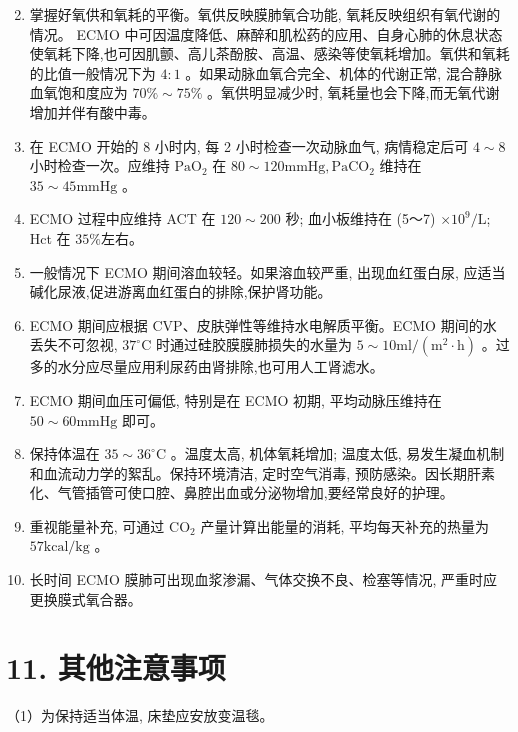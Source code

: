 \documentclass[10pt]{article}
\begin{document}
\begin{enumerate}
  \setcounter{enumi}{1}
  \item 掌握好氧供和氧耗的平衡。氧供反映膜肺氧合功能, 氧耗反映组织有氧代谢的情况。 ECMO 中可因温度降低、麻醉和肌松药的应用、自身心肺的休息状态使氧耗下降,也可因肌颤、高儿茶酚胺、高温、感染等使氧耗增加。氧供和氧耗的比值一般情况下为 $4: 1$ 。如果动脉血氧合完全、机体的代谢正常, 混合静脉血氧饱和度应为 $70 \% \sim 75 \%$ 。氧供明显减少时, 氧耗量也会下降,而无氧代谢增加并伴有酸中毒。

  \item 在 ECMO 开始的 8 小时内, 每 2 小时检查一次动脉血气, 病情稳定后可 $4 \sim 8$ 小时检查一次。应维持 $\mathrm{PaO}_{2}$ 在 $80 \sim 120 \mathrm{mmHg}, \mathrm{PaCO}_{2}$ 维持在 $35 \sim 45 \mathrm{mmHg}$ 。

  \item ECMO 过程中应维持 ACT 在 $120 \sim 200$ 秒; 血小板维持在 (5～7) $\times 10^{9} / \mathrm{L}$; Hct 在 $35 \%$左右。

  \item 一般情况下 ECMO 期间溶血较轻。如果溶血较严重, 出现血红蛋白尿, 应适当碱化尿液,促进游离血红蛋白的排除,保护肾功能。

  \item ECMO 期间应根据 CVP、皮肤弹性等维持水电解质平衡。ECMO 期间的水丢失不可忽视, $37^{\circ} \mathrm{C}$ 时通过硅胶膜膜肺损失的水量为 $5 \sim 10 \mathrm{ml} /\left(\mathrm{m}^{2} \cdot \mathrm{h}\right)$ 。过多的水分应尽量应用利尿药由肾排除,也可用人工肾滤水。

  \item ECMO 期间血压可偏低, 特别是在 ECMO 初期, 平均动脉压维持在 $50 \sim 60 \mathrm{mmHg}$ 即可。

  \item 保持体温在 $35 \sim 36^{\circ} \mathrm{C}$ 。温度太高, 机体氧耗增加; 温度太低, 易发生凝血机制和血流动力学的絮乱。保持环境清洁, 定时空气消毒, 预防感染。因长期肝素化、气管插管可使口腔、鼻腔出血或分泌物增加,要经常良好的护理。

  \item 重视能量补充, 可通过 $\mathrm{CO}_{2}$ 产量计算出能量的消耗, 平均每天补充的热量为 $57 \mathrm{kcal} / \mathrm{kg}$ 。

  \item 长时间 ECMO 膜肺可出现血浆渗漏、气体交换不良、检塞等情况, 严重时应更换膜式氧合器。

\end{enumerate}

\section*{11. 其他注意事项}
（1）为保持适当体温, 床垫应安放变温毯。
\end{document}
